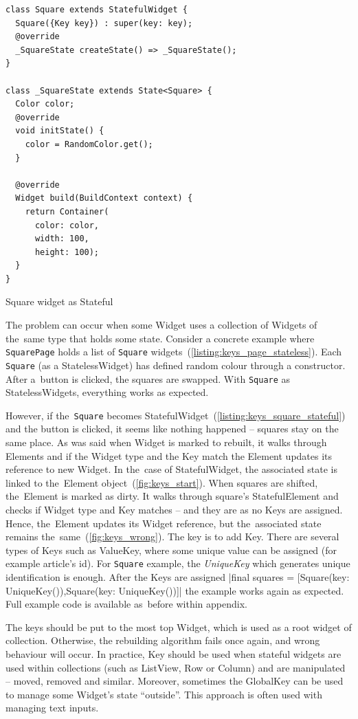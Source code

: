 \begin{listing}[ht]
\begin{verbatim}
class Square extends StatefulWidget {
  Square({Key key}) : super(key: key);
  @override
  _SquareState createState() => _SquareState();
}

class _SquareState extends State<Square> {
  Color color;
  @override
  void initState() {
    color = RandomColor.get();
  }

  @override
  Widget build(BuildContext context) {
    return Container(
      color: color,
      width: 100,
      height: 100);
  }
}
\end{verbatim}
\caption{Square widget as Stateful}
\label{listing:keys_square_stateful}
\end{listing}

The problem can occur when some Widget uses a collection of Widgets of the~same type that holds some state.  Consider a concrete example where \verb|SquarePage| holds a list of \verb|Square| widgets~(\cref{listing:keys_page_stateless}). Each \verb|Square| (as a StatelessWidget) has defined random colour through a constructor. After a~button is clicked, the squares are swapped. With \verb|Square| as StatelessWidgets, everything works as expected. 

However, if the~\verb|Square| becomes StatefulWidget~(\cref{listing:keys_square_stateful}) and the button is clicked, it seems like nothing happened -- squares stay on the same place. As was said when Widget is marked to rebuilt, it walks through Elements and if the Widget type and the Key match the Element updates its reference to new Widget. In the~case of StatefulWidget, the associated state is linked to the~Element object~(\cref{fig:keys_start}). When squares are shifted, the~Element is marked as dirty. It walks through square's StatefulElement and checks if Widget type and Key matches -- and they are as no Keys are assigned. Hence, the~Element updates its Widget reference, but the~associated state remains the~same~(\cref{fig:keys_wrong}). 
The key is to add Key. There are several types of Keys such as ValueKey, where some unique value can be assigned (for example article's id). For \verb|Square| example, the \textit{UniqueKey} which generates unique identification is enough.  After the Keys are assigned |final squares = [Square(key: UniqueKey()),Square(key: UniqueKey())]| the example works again as expected. Full example code is available as~before within appendix.

The keys should be put to the most top Widget, which is used as a root widget of collection. Otherwise, the rebuilding algorithm fails once again, and wrong behaviour will occur. In practice, Key should be used when stateful widgets are used within collections (such as ListView, Row or Column) and are manipulated -- moved, removed and similar.  Moreover, sometimes the GlobalKey can be used to manage some Widget's state ``outside''. This approach is often used with managing text inputs. 
